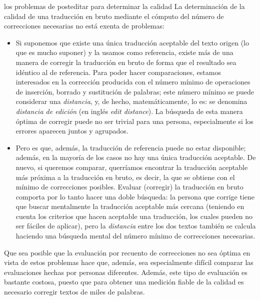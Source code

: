 \begin{persabermes}{los problemas de posteditar para determinar la calidad} La determinación de la calidad de una traducción en bruto mediante el cómputo del número de correcciones necesarias no está exenta de problemas: \begin{itemize} \item Si suponemos que existe una única traducción aceptable del texto origen (lo que es mucho suponer) y la usamos como referencia, existe más de una manera de corregir la traducción en bruto de forma que el resultado sea idéntico al de referencia. Para poder hacer comparaciones, estamos interesados en la corrección producida con el número mínimo de operaciones de inserción, borrado y sustitución de palabras; este número mínimo se puede considerar una \emph{distancia}, y, de hecho, matemáticamente, lo es: se denomina \emph{distancia de edición} (en inglés \emph{edit distance}). La búsqueda de esta manera óptima de corregir puede no ser trivial para una persona, especialmente si los errores aparecen juntos y agrupados. \item Pero es que, además, la traducción de referencia puede no estar disponible; además, en la mayoría de los casos no hay una única traducción aceptable. De nuevo, si queremos comparar, querríamos encontrar la traducción aceptable más próxima a la traducción en bruto, es decir, la que se obtiene con el mínimo de correcciones posibles. Evaluar (corregir) la traducción en bruto comporta por lo tanto hacer una doble búsqueda: la persona que corrige tiene que buscar mentalmente la traducción aceptable más cercana (teniendo en cuenta los criterios que hacen aceptable una traducción, los cuales pueden no ser fáciles de aplicar), pero la \emph{distancia} entre los dos textos también se calcula haciendo una búsqueda mental del número mínimo de correcciones necesarias. \end{itemize} Que sea posible que la evaluación por recuento de correcciones no sea óptima en vista de estos problemas hace que, además, sea especialmente difícil comparar las evaluaciones hechas por personas diferentes. Además, este tipo de evaluación es bastante costosa, puesto que para obtener una medición fiable de la calidad es necesario corregir textos de miles de palabras. \end{persabermes} 

